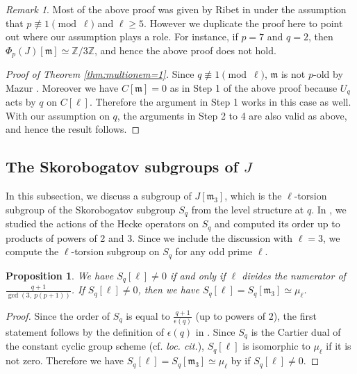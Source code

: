\documentclass[a4paper, 12pt]{amsart}
\newtheorem{prop}[thm]{Proposition}
\theoremstyle{definition}
\theoremstyle{remark}
\newtheorem{rem}[thm]{Remark}
\numberwithin{equation}{section} \numberwithin{table}{section}
\begin{document}
\begin{rem}
Most of the above proof was given by Ribet in \cite[Appendix B]{Yoo14a} under the assumption that $p \not\equiv 1{{ \!\pmod {\ell}}}$ and $\ell\geq 5$. However we duplicate the proof here to point out where our assumption plays a role. For instance, if $p=7$ and $q=2$, then $\Phi_p(J)[{{\mathfrak{m}}}] \simeq {{{{\mathbb{Z}}}/{{3}}{{\mathbb{Z}}}}}$, and hence the above proof does not hold.
\end{rem}

\begin{proof}[Proof of Theorem \ref{thm:multionem=1}] Since $q\not\equiv 1{{ \!\pmod {\ell}}}$, ${{\mathfrak{m}}}$ is not $p$-old by Mazur \cite{M77}. Moreover we have $C[{{\mathfrak{m}}}]=0$ as in Step 1 of the above proof because $U_q$ acts by $q$ on $C[\ell]$. Therefore the argument in Step 1 works in this case as well. With our assumption on $q$, the arguments in Step 2 to 4 are also valid as above, and hence the result follows.
\end{proof}

\subsection{The Skorobogatov subgroups of $J$}\label{sec:Skorobogatov}
In this subsection, we discuss a subgroup of $J[{{\mathfrak{m}}}_3]$, which is the $\ell$-torsion subgroup of the Skorobogatov subgroup $S_q$ from the level structure at $q$. 
In \cite[Appendix C]{Yoo14a}, we studied the actions of the Hecke operators on $S_q$ and computed its order {{up to products of powers of 2 and 3}}. Since we include the discussion with $\ell=3$, we compute the $\ell$-torsion subgroup on $S_q$ for any odd prime $\ell$. 
\begin{prop}\label{prop:skoro}
We have $S_q[\ell] \neq 0$ if and only if $\ell$ divides the numerator of $\frac{q+1}{\gcd(3, ~p(p+1))}$. If $S_q[\ell]\neq 0$, then we have $S_q[\ell]=S_q[{{\mathfrak{m}}}_3]\simeq {{\mu_{\ell}}}$.
\end{prop}
\begin{proof}
Since the order of $S_q$ is equal to $\frac{q+1}{\epsilon(q)}$ (up to powers of $2$), the first statement follows by the definition of $\epsilon(q)$ in \cite[p.~781]{Sk05}. 
Since $S_q$ is the Cartier dual of the constant cyclic group scheme (cf. \textit{loc. cit.}), $S_q[\ell]$ is isomorphic to ${{\mu_{\ell}}}$ if it is not zero. Therefore we have $S_q[\ell]=S_q[{{\mathfrak{m}}}_3]\simeq {{\mu_{\ell}}}$ by \cite[Proposition C.2]{Yoo14a} if $S_q[\ell]\neq 0$. 
\end{proof}
\end{document}
